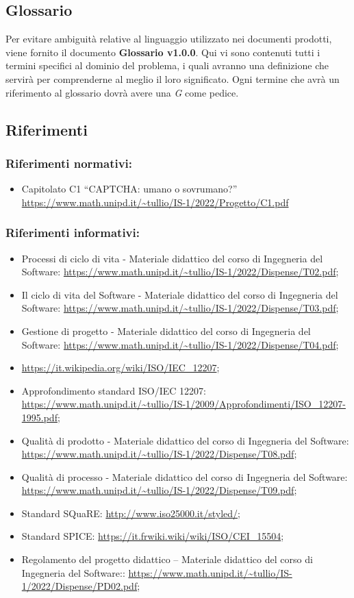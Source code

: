 \subsection{Glossario}
Per evitare ambiguità relative al linguaggio utilizzato nei documenti prodotti, viene fornito il documento \textbf{Glossario v1.0.0}. Qui vi sono contenuti tutti i termini specifici al dominio del problema, i quali avranno una definizione che servirà per comprenderne al meglio il loro significato. Ogni termine che avrà un riferimento al glossario dovrà avere una \textit{G} come pedice. 

\subsection{Riferimenti}

\subsubsection{Riferimenti normativi:}\:
\begin{itemize}
	\item Capitolato C1 “CAPTCHA: umano o sovrumano?”
	\url{https://www.math.unipd.it/~tullio/IS-1/2022/Progetto/C1.pdf}
\end{itemize}

\subsubsection{Riferimenti informativi:}\:
\begin{itemize}
	\item Processi di ciclo di vita - Materiale didattico del corso di Ingegneria del Software: \url{https://www.math.unipd.it/~tullio/IS-1/2022/Dispense/T02.pdf};
	\item Il ciclo di vita del Software - Materiale didattico del corso di Ingegneria del Software: \url{https://www.math.unipd.it/~tullio/IS-1/2022/Dispense/T03.pdf};
	\item Gestione di progetto - Materiale didattico del corso di Ingegneria del Software: \url{https://www.math.unipd.it/~tullio/IS-1/2022/Dispense/T04.pdf};
	\item \url{https://it.wikipedia.org/wiki/ISO/IEC_12207};
	\item Approfondimento standard ISO/IEC 12207:  \url{https://www.math.unipd.it/~tullio/IS-1/2009/Approfondimenti/ISO_12207-1995.pdf};
	\item Qualità di prodotto - Materiale didattico del corso di Ingegneria del Software: \url{https://www.math.unipd.it/~tullio/IS-1/2022/Dispense/T08.pdf};
	\item Qualità di processo - Materiale didattico del corso di Ingegneria del Software: \url{https://www.math.unipd.it/~tullio/IS-1/2022/Dispense/T09.pdf};
	\item Standard SQuaRE: \url{http://www.iso25000.it/styled/};
	\item Standard SPICE: \url{https://it.frwiki.wiki/wiki/ISO/CEI_15504};
	\item Regolamento del progetto didattico – Materiale didattico del corso di Ingegneria del Software::
	\url{https://www.math.unipd.it/~tullio/IS-1/2022/Dispense/PD02.pdf};
\end{itemize}
